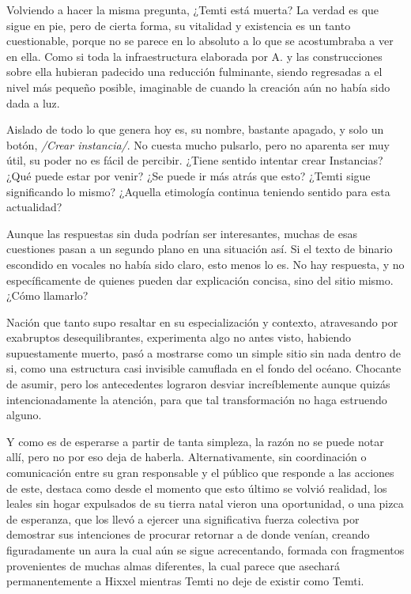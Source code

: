 \documentclass[
]{book}
\begin{document}
Volviendo a hacer la misma pregunta, ¿Temti está muerta? La verdad es que sigue en pie, pero de cierta forma, su vitalidad y existencia es un tanto cuestionable, porque no se parece en lo absoluto a lo que se acostumbraba a ver en ella. Como si toda la infraestructura elaborada por A. y las construcciones sobre ella hubieran padecido una reducción fulminante, siendo regresadas a el nivel más pequeño posible, imaginable de cuando la creación aún no había sido dada a luz.

Aislado de todo lo que genera hoy es, su nombre, bastante apagado, y solo un botón, \emph{/Crear instancia/}. No cuesta mucho pulsarlo, pero no aparenta ser muy útil, su poder no es fácil de percibir. ¿Tiene sentido intentar crear Instancias? ¿Qué puede estar por venir? ¿Se puede ir más atrás que esto? ¿Temti sigue significando lo mismo? ¿Aquella etimología continua teniendo sentido para esta actualidad?

Aunque las respuestas sin duda podrían ser interesantes, muchas de esas cuestiones pasan a un segundo plano en una situación así. Si el texto de binario escondido en vocales no había sido claro, esto menos lo es. No hay respuesta, y no específicamente de quienes pueden dar explicación concisa, sino del sitio mismo. ¿Cómo llamarlo?

Nación que tanto supo resaltar en su especialización y contexto, atravesando por exabruptos desequilibrantes, experimenta algo no antes visto, habiendo supuestamente muerto, pasó a mostrarse como un simple sitio sin nada dentro de si, como una estructura casi invisible camuflada en el fondo del océano. Chocante de asumir, pero los antecedentes lograron desviar increíblemente aunque quizás intencionadamente la atención, para que tal transformación no haga estruendo alguno.

Y como es de esperarse a partir de tanta simpleza, la razón no se puede notar allí, pero no por eso deja de haberla. Alternativamente, sin coordinación o comunicación entre su gran responsable y el público que responde a las acciones de este, destaca como desde el momento que esto último se volvió realidad, los leales sin hogar expulsados de su tierra natal vieron una oportunidad, o una pizca de esperanza, que los llevó a ejercer una significativa fuerza colectiva por demostrar sus intenciones de procurar retornar a de donde venían, creando figuradamente un aura la cual aún se sigue acrecentando, formada con fragmentos provenientes de muchas almas diferentes, la cual parece que asechará permanentemente a Hixxel mientras Temti no deje de existir como Temti.
\end{document}
